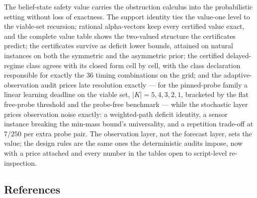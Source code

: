 \documentclass[10pt,twocolumn]{article}
\theoremstyle{plain}
\theoremstyle{definition}
\theoremstyle{remark}
\begin{document}
The belief-state safety value carries the obstruction calculus into the
probabilistic setting without loss of exactness. The support identity
ties the value-one level to the viable-set recursion; rational
alpha-vectors keep every certified value exact, and the complete value
table shows the two-valued structure the certificates predict; the
certificates survive as deficit lower bounds, attained on natural
instances on both the symmetric and the asymmetric prior; the certified
delayed-regime class agrees with its closed form cell by cell, with the class declaration responsible for exactly the 36 timing
combinations on the grid; and the adaptive-observation audit prices late resolution exactly ---
for the pinned-probe family a linear learning deadline on the viable
set, \(|K| = 5, 4, 3, 2, 1\), bracketed by the flat free-probe
threshold and the probe-free benchmark --- while the stochastic layer
prices observation noise exactly: a weighted-path deficit identity, a
sensor instance breaking the min-mass bound's universality, and a
repetition trade-off at \(7/250\) per extra probe pair. The
observation layer, not the forecast layer, sets the value; the design
rules are the same ones the deterministic audits impose, now with a
price attached and every number in the tables open to script-level
re-inspection.

\subsection*{References}
\end{document}
